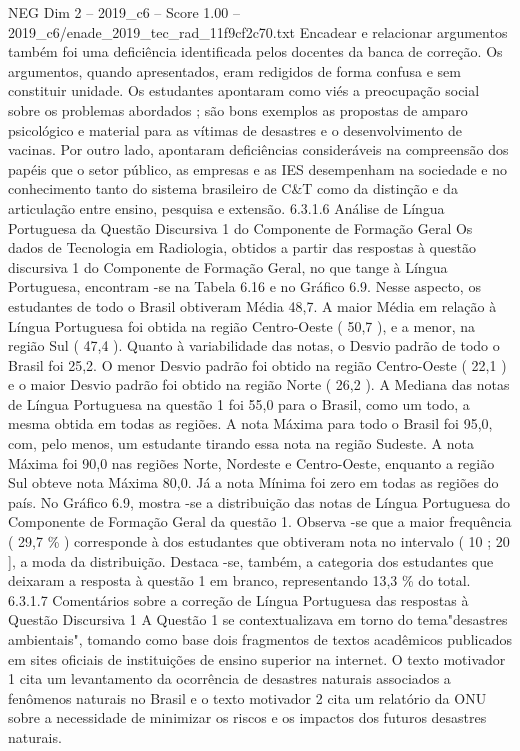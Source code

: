 \begin{textsample}{NEG Dim 2 – 2019\_c6 – Score 1.00 – 2019\_c6/enade\_2019\_tec\_rad\_11f9cf2c70.txt}
Encadear e relacionar argumentos também foi uma deficiência identificada pelos docentes da banca de correção.
Os argumentos, quando apresentados, eram redigidos de forma confusa e sem constituir unidade.
Os estudantes apontaram como viés a preocupação social sobre os problemas abordados ; são bons exemplos as propostas de amparo psicológico e material para as vítimas de desastres e o desenvolvimento de vacinas.
Por outro lado, apontaram deficiências consideráveis na compreensão dos papéis que o setor público, as empresas e as IES desempenham na sociedade e no conhecimento tanto do sistema brasileiro de C\&T como da distinção e da articulação entre ensino, pesquisa e extensão. 6.3.1.6 Análise de Língua Portuguesa da Questão Discursiva 1 do Componente de Formação Geral Os dados de Tecnologia em Radiologia, obtidos a partir das respostas à questão discursiva 1 do Componente de Formação Geral, no que tange à Língua Portuguesa, encontram -se na Tabela 6.16 e no Gráfico 6.9.
Nesse aspecto, os estudantes de todo o Brasil obtiveram Média 48,7.
A maior Média em relação à Língua Portuguesa foi obtida na região Centro-Oeste ( 50,7 ), e a menor, na região Sul ( 47,4 ).
Quanto à variabilidade das notas, o Desvio padrão de todo o Brasil foi 25,2.
O menor Desvio padrão foi obtido na região Centro-Oeste ( 22,1 ) e o maior Desvio padrão foi obtido na região Norte ( 26,2 ).
A Mediana das notas de Língua Portuguesa na questão 1 foi 55,0 para o Brasil, como um todo, a mesma obtida em todas as regiões.
A nota Máxima para todo o Brasil foi 95,0, com, pelo menos, um estudante tirando essa nota na região Sudeste.
A nota Máxima foi 90,0 nas regiões Norte, Nordeste e Centro-Oeste, enquanto a região Sul obteve nota Máxima 80,0.
Já a nota Mínima foi zero em todas as regiões do país.
No Gráfico 6.9, mostra -se a distribuição das notas de Língua Portuguesa do Componente de Formação Geral da questão 1.
Observa -se que a maior frequência ( 29,7 \% ) corresponde à dos estudantes que obtiveram nota no intervalo ( 10 ; 20 ], a moda da distribuição.
Destaca -se, também, a categoria dos estudantes que deixaram a resposta à questão 1 em branco, representando 13,3 \% do total. 6.3.1.7 Comentários sobre a correção de Língua Portuguesa das respostas à Questão Discursiva 1 A Questão 1 se contextualizava em torno do tema"desastres ambientais", tomando como base dois fragmentos de textos acadêmicos publicados em sites oficiais de instituições de ensino superior na internet.
O texto motivador 1 cita um levantamento da ocorrência de desastres naturais associados a fenômenos naturais no Brasil e o texto motivador 2 cita um relatório da ONU sobre a necessidade de minimizar os riscos e os impactos dos futuros desastres naturais.

\end{textsample}
